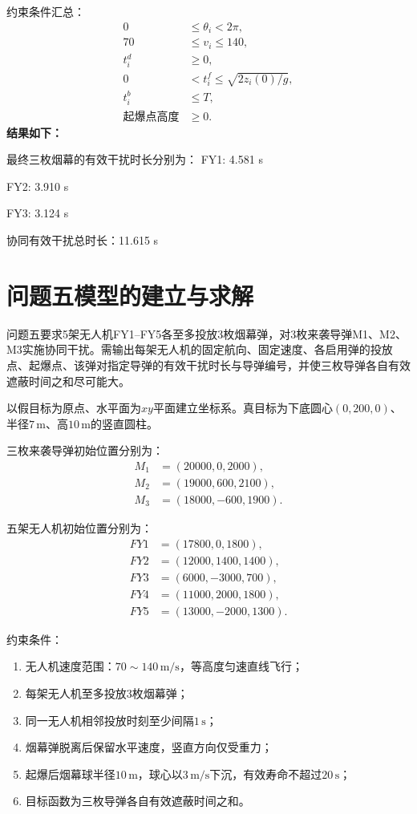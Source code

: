 \documentclass[12pt,a4paper]{article}
\begin{document}
	约束条件汇总：
	\begin{align}
		0&\leq\theta_i<2\pi,\\
		70&\leq v_i\leq140,\\
		t_i^d&\geq0,\\
		0&<t_i^f\leq\sqrt{2z_i(0)/g},\\
		t_i^b&\leq T,\\
		\text{起爆点高度}&\geq0.
	\end{align}
	\textbf{结果如下：}
	
	最终三枚烟幕的有效干扰时长分别为：
	FY1: 4.581 s
	
	FY2: 3.910 s
	
	FY3: 3.124 s
	
	协同有效干扰总时长：11.615 s

	\section{问题五模型的建立与求解}
	
	
	
	问题五要求5架无人机FY1–FY5各至多投放3枚烟幕弹，对3枚来袭导弹M1、M2、M3实施协同干扰。需输出每架无人机的固定航向、固定速度、各启用弹的投放点、起爆点、该弹对指定导弹的有效干扰时长与导弹编号，并使三枚导弹各自有效遮蔽时间之和尽可能大。
	
	
	
	以假目标为原点、水平面为$xy$平面建立坐标系。真目标为下底圆心$(0,200,0)$、半径$7\,\text{m}$、高$10\,\text{m}$的竖直圆柱。
	
	三枚来袭导弹初始位置分别为：
	\begin{align}
		M_1&=(20000,0,2000),\\
		M_2&=(19000,600,2100),\\
		M_3&=(18000,-600,1900).
	\end{align}
	
	五架无人机初始位置分别为：
	\begin{align}
		FY1&=(17800,0,1800),\\
		FY2&=(12000,1400,1400),\\
		FY3&=(6000,-3000,700),\\
		FY4&=(11000,2000,1800),\\
		FY5&=(13000,-2000,1300).
	\end{align}
	
	约束条件：
	\begin{enumerate}[label=(\arabic*)]
		\item 无人机速度范围：$70\sim140\,\text{m/s}$，等高度匀速直线飞行；
		\item 每架无人机至多投放3枚烟幕弹；
		\item 同一无人机相邻投放时刻至少间隔$1\,\text{s}$；
		\item 烟幕弹脱离后保留水平速度，竖直方向仅受重力；
		\item 起爆后烟幕球半径$10\,\text{m}$，球心以$3\,\text{m/s}$下沉，有效寿命不超过$20\,\text{s}$；
		\item 目标函数为三枚导弹各自有效遮蔽时间之和。
	\end{enumerate}
	
\end{document}
